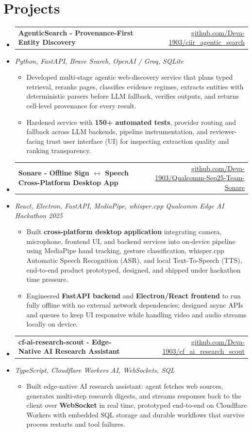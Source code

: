 \documentclass[letterpaper,10pt]{article}
\makeatletter
\newcommand{\resumeItem}[1]{
  \item\small{#1\vspace{-1pt}}
}
\newcommand{\resumeProjectHeading}[2]{
    \item
    \begin{tabular*}{0.985\textwidth}[t]{l@{\extracolsep{\fill}}r}
      \small\textbf{#1} & \small #2 \\
    \end{tabular*}\vspace{-5pt}
}
\newcommand{\resumeProjectSubheading}[1]{
  \vspace{-2pt}\item[] {\small\textcolor{ResumeSlate}{\emph{#1}}}\vspace{-3pt}
}
\newcommand{\resumeSubHeadingListStart}{\begin{itemize}[leftmargin=0.0in, label={}, itemsep=2pt, topsep=2pt]}
\newcommand{\resumeSubHeadingListEnd}{\end{itemize}}
\newcommand{\resumeItemListStart}{\begin{itemize}[leftmargin=0.18in, itemsep=2pt, topsep=1pt]}
\newcommand{\resumeItemListEnd}{\end{itemize}\vspace{-4pt}}
\makeatother
\begin{document}
\section{Projects}
\resumeSubHeadingListStart
  \resumeProjectHeading
    {AgenticSearch - Provenance-First Entity Discovery}
    {\href{https://github.com/Deva-1903/ciir_agentic_search}{github.com/Deva-1903/ciir\_agentic\_search}}
  \resumeProjectSubheading{Python, FastAPI, Brave Search, OpenAI / Groq, SQLite}
    \resumeItemListStart
      \resumeItem{Developed multi-stage agentic web-discovery service that plans typed retrieval, reranks pages, classifies evidence regimes, extracts entities with deterministic parsers before LLM fallback, verifies outputs, and returns cell-level provenance for every result.}
      \resumeItem{Hardened service with \textbf{150+ automated tests}, provider routing and fallback across LLM backends, pipeline instrumentation, and reviewer-facing trust user interface (UI) for inspecting extraction quality and ranking transparency.}
    \resumeItemListEnd
  \resumeProjectHeading
    {Sonare - Offline Sign \(\leftrightarrow\) Speech Cross-Platform Desktop App}
    {\href{https://github.com/Deva-1903/Qualcomm-Sep25-Team-Sonare}{github.com/Deva-1903/Qualcomm-Sep25-Team-Sonare}}
  \resumeProjectSubheading{React, Electron, FastAPI, MediaPipe, whisper.cpp \enspace\textbar\enspace Qualcomm Edge AI Hackathon 2025}
    \resumeItemListStart
      \resumeItem{Built \textbf{cross-platform desktop application} integrating camera, microphone, frontend UI, and backend services into on-device pipeline using MediaPipe hand tracking, gesture classification, whisper.cpp Automatic Speech Recognition (ASR), and local Text-To-Speech (TTS), end-to-end product prototyped, designed, and shipped under hackathon time pressure.}
      \resumeItem{Engineered \textbf{FastAPI backend} and \textbf{Electron/React frontend} to run fully offline with no external network dependencies; designed async APIs and queues to keep UI responsive while handling video and audio streams locally on device.}
    \resumeItemListEnd
  \resumeProjectHeading
    {cf-ai-research-scout - Edge-Native AI Research Assistant}
    {\href{https://github.com/Deva-1903/cf_ai_research_scout}{github.com/Deva-1903/cf\_ai\_research\_scout}}
  \resumeProjectSubheading{TypeScript, Cloudflare Workers AI, WebSockets, SQL}
    \resumeItemListStart
      \resumeItem{Built edge-native AI research assistant: agent fetches web sources, generates multi-step research digests, and streams responses back to the client over \textbf{WebSocket} in real time, prototyped end-to-end on Cloudflare Workers with embedded SQL storage and durable workflows that survive process restarts and tool failures.}
    \resumeItemListEnd
\resumeSubHeadingListEnd
\vspace{-4pt}
\end{document}

